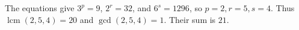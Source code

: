 The equations give $3^p=9$, $2^r=32$, and $6^s=1296$, so $p=2,r=5,s=4$. Thus $\operatorname{lcm}(2,5,4)=20$ and $\gcd(2,5,4)=1$. Their sum is $\boxed{21}$.

